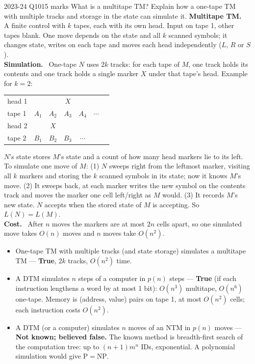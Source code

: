 \documentclass[10.5pt,a4paper]{article}
\newcommand{\ansh}[1]{\textbf{\color{exborder}#1}\ }
\newcommand{\NP}{\mathrm{NP}}
\renewcommand{\P}{\mathrm{P}}
\begin{document}
\begin{examq}{2023-24 Q10}{15 marks}
What is a multitape TM? Explain how a one-tape TM with multiple tracks and storage in the state can simulate it.
\tcblower
\ansh{Multitape TM.} A finite control with $k$ tapes, each with its own head. Input on tape 1, other tapes blank. One move depends on the
state and all $k$ scanned symbols; it changes state, writes on each tape and moves each head independently ($L$, $R$ or $S$).\\
\ansh{Simulation.} One-tape $N$ uses $2k$ tracks: for each tape of $M$, one track holds its contents and one track holds a single marker $X$
under that tape's head. Example for $k=2$:
\begin{center}\small
\begin{tabular}{l|cccccc}
head 1 & & & $X$ & & &\\
tape 1 & $A_1$ & $A_2$ & $A_3$ & $A_4$ & $\cdots$ &\\
head 2 & & $X$ & & & &\\
tape 2 & $B_1$ & $B_2$ & $B_3$ & $\cdots$ & &
\end{tabular}
\end{center}
$N$'s state stores $M$'s state and a count of how many head markers lie to its left. To simulate one move of $M$:
(1) $N$ sweeps right from the leftmost marker, visiting all $k$ markers and storing the $k$ scanned symbols in its state; now it knows $M$'s move.
(2) It sweeps back, at each marker writes the new symbol on the contents track and moves the marker one cell left/right as $M$ would.
(3) It records $M$'s new state. $N$ accepts when the stored state of $M$ is accepting. So $L(N)=L(M)$.\\
\ansh{Cost.} After $n$ moves the markers are at most $2n$ cells apart, so one simulated move takes $O(n)$ moves and $n$ moves take $O(n^2)$.
\end{examq}

\begin{recipe}
\begin{itemize}
\item One-tape TM with multiple tracks (and state storage) simulates a multitape TM --- \textbf{True}, $2k$ tracks, $O(n^2)$ time.
\item A DTM simulates $n$ steps of a computer in $p(n)$ steps --- \textbf{True} (if each instruction lengthens a word by at most 1 bit):
$O(n^3)$ multitape, $O(n^6)$ one-tape. Memory is (address, value) pairs on tape 1, at most $O(n^2)$ cells; each instruction costs $O(n^2)$.
\item A DTM (or a computer) simulates $n$ moves of an NTM in $p(n)$ moves --- \textbf{Not known; believed false.} The known method is breadth-first
search of the computation tree: up to $(n+1)m^n$ IDs, exponential. A polynomial simulation would give $\P=\NP$.
\end{itemize}
\end{recipe}
\end{document}
